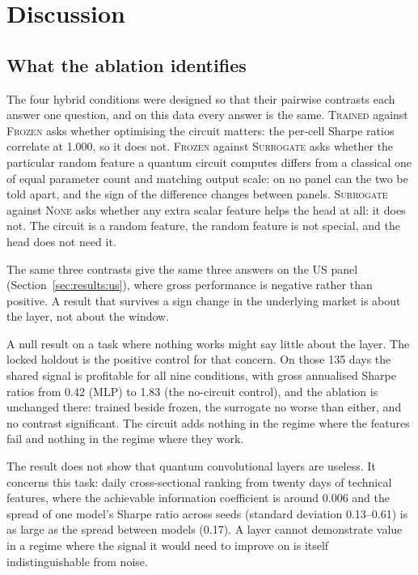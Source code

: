 \section{Discussion}
\label{sec:discussion}

\subsection{What the ablation identifies}
The four hybrid conditions were designed so that their pairwise contrasts each
answer one question, and on this data every answer is the same.
\textsc{Trained} against \textsc{Frozen} asks whether optimising the circuit
matters: the per-cell Sharpe ratios correlate at \num{1.000}, so it does not.
\textsc{Frozen} against \textsc{Surrogate} asks whether the particular random
feature a quantum circuit computes differs from a classical one of equal
parameter count and matching output scale: on no panel can the two be told
apart, and the sign of the difference changes between panels. \textsc{Surrogate}
against \textsc{None} asks whether any extra scalar feature helps the head at
all: it does not. The circuit is a random feature, the random feature is not
special, and the head does not need it.

The same three contrasts give the same three answers on the US panel
(Section~\ref{sec:results:us}), where gross performance is negative rather than
positive. A result that survives a sign change in the underlying market is
about the layer, not about the window.

A null result on a task where nothing works might say little about the layer.
The locked holdout is the positive control for that concern. On those \num{135} days the shared signal is profitable for all
nine conditions, with gross annualised Sharpe ratios from \num{+0.42} (MLP)
to \num{+1.83} (the no-circuit control), and the ablation is unchanged there: trained beside frozen, the
surrogate no worse than either, and no contrast significant. The circuit adds
nothing in the regime where the features fail and nothing in the regime where
they work.

The result does not show that quantum convolutional layers are useless. It
concerns this task: daily cross-sectional ranking from twenty days of
technical features, where the achievable information coefficient is around
\num{0.006} and the spread of one model's Sharpe ratio across seeds
(standard deviation \numrange{0.13}{0.61}) is as large as the spread between
models (\num{0.17}). A layer cannot demonstrate value in a regime where the
signal it would need to improve on is itself indistinguishable from noise.

